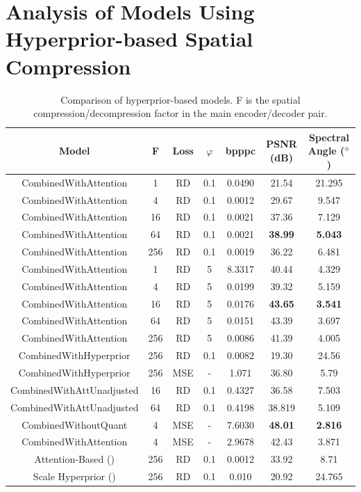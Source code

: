 \section[Analysis of Hyperprior-based Models]{Analysis of Models Using Hyperprior-based Spatial Compression\label{sec:ch5hyperprior}}
\begin{table}
\centering
\caption{Comparison of hyperprior-based models. F is the spatial compression/decompression factor in the main encoder/decoder pair.}
\begin{tabular}{|c|c|c|c|c|c|c|}
\hline
Model & F & Loss &$\varphi$ & bpppc & PSNR (dB) & Spectral Angle ($\degree$) \\
\hline\hline
CombinedWithAttention & 1 & RD & 0.1 & 0.0490 & 21.54 & 21.295 \\
\hline
CombinedWithAttention & 4 & RD & 0.1 & 0.0012 & 29.67 & 9.547 \\
\hline
CombinedWithAttention & 16 & RD & 0.1 & 0.0021 & 37.36 & 7.129 \\
\hline
CombinedWithAttention & 64 & RD & 0.1 & 0.0021 & \textbf{38.99} & \textbf{5.043} \\
\hline
CombinedWithAttention & 256 & RD & 0.1 & 0.0019 & 36.22 & 6.481 \\
\hline
CombinedWithAttention & 1 & RD & 5 & 8.3317 & 40.44 & 4.329 \\
\hline
CombinedWithAttention & 4 & RD & 5 & 0.0199 & 39.32 & 5.159 \\
\hline
CombinedWithAttention & 16 & RD & 5 & 0.0176 & \textbf{43.65} & \textbf{3.541} \\
\hline
CombinedWithAttention & 64 & RD & 5 & 0.0151 & 43.39 & 3.697 \\
\hline
CombinedWithAttention & 256 & RD & 5 & 0.0086 & 41.39 & 4.005 \\
\hline
CombinedWithHyperprior & 256 & RD & 0.1 & 0.0082 & 19.30 & 24.56 \\
\hline
CombinedWithHyperprior & 256 & MSE & - & 1.071 & 36.80 & 5.79 \\
\hline
CombinedWithAttUnadjusted & 16 & RD & 0.1 & 0.4327 & 36.58 & 7.503 \\
\hline
CombinedWithAttUnadjusted & 64 & RD & 0.1 & 0.4198 & 38.819 & 5.109 \\
\hline
CombinedWithoutQuant & 4 & MSE & - & 7.6030 & \textbf{48.01} & \textbf{2.816} \\
\hline
CombinedWithAttention & 4 & MSE & - & 2.9678 & 42.43 & 3.871 \\
\hline
Attention-Based (\citep{cheng_learned_2020}) & 256 & RD & 0.1 & 0.0012 & 33.92 & 8.71 \\
\hline
Scale Hyperprior (\citep{balle_variational_2018}) & 256 & RD & 0.1 & 0.010 & 20.92 & 24.765 \\
\hline
\end{tabular}
\label{fig:hyperpriorcomp}
\end{table}

